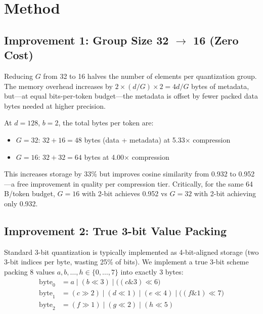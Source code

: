 \documentclass{article}
\begin{document}

\section{Method}
\label{sec:method}

\subsection{Improvement 1: Group Size 32 $\to$ 16 (Zero Cost)}
\label{sec:gs}

Reducing $G$ from 32 to 16 halves the number of elements per quantization group. The memory overhead increases by $2 \times (d/G) \times 2 = 4d/G$ bytes of metadata, but—at equal bits-per-token budget—the metadata is offset by fewer packed data bytes needed at higher precision.

At $d=128$, $b=2$, the total bytes per token are:
\begin{itemize}
\item $G=32$: $32 + 16 = 48$ bytes (data + metadata) at 5.33$\times$ compression
\item $G=16$: $32 + 32 = 64$ bytes at 4.00$\times$ compression
\end{itemize}
This increases storage by 33\% but improves cosine similarity from 0.932 to 0.952—a free improvement in quality per compression tier. Critically, for the same 64 B/token budget, $G=16$ with 2-bit achieves 0.952 vs $G=32$ with 2-bit achieving only 0.932.

\subsection{Improvement 2: True 3-bit Value Packing}
\label{sec:3bit}

Standard 3-bit quantization is typically implemented as 4-bit-aligned storage (two 3-bit indices per byte, wasting 25\% of bits). We implement a true 3-bit scheme packing 8 values $a, b, \ldots, h \in \{0,\ldots,7\}$ into exactly 3 bytes:
\begin{align*}
\text{byte}_0 &= a \mid (b \mathbin{\ll} 3) \mid \big((c \mathbin{\&} 3) \mathbin{\ll} 6\big) \\
\text{byte}_1 &= (c \mathbin{\gg} 2) \mid (d \mathbin{\ll} 1) \mid (e \mathbin{\ll} 4) \mid \big((f \mathbin{\&} 1) \mathbin{\ll} 7\big) \\
\text{byte}_2 &= (f \mathbin{\gg} 1) \mid (g \mathbin{\ll} 2) \mid (h \mathbin{\ll} 5)
\end{align*}
\end{document}
